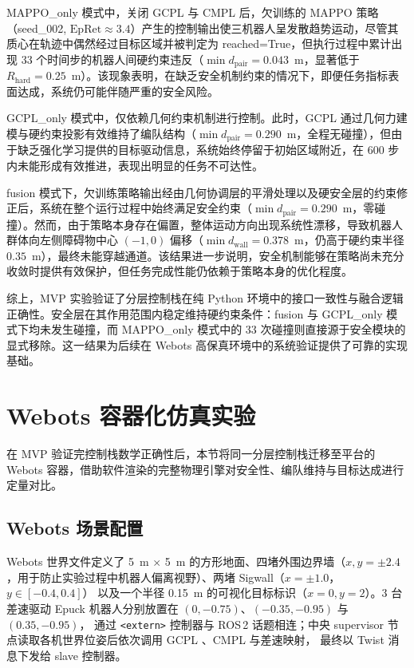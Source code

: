 MAPPO\_only 模式中，关闭 GCPL 与 CMPL 后，欠训练的 MAPPO 策略（seed\_002, $\mathrm{EpRet}\approx 3.4$）产生的控制输出使三机器人呈发散趋势运动，尽管其质心在轨迹中偶然经过目标区域并被判定为 reached=True，但执行过程中累计出现 33 个时间步的机器人间硬约束违反（$\min d_\mathrm{pair}=0.043$~m，显著低于 $R_\mathrm{hard}=0.25$~m）。该现象表明，在缺乏安全机制约束的情况下，即便任务指标表面达成，系统仍可能伴随严重的安全风险。

GCPL\_only 模式中，仅依赖几何约束机制进行控制。此时，GCPL 通过几何力建模与硬约束投影有效维持了编队结构（$\min d_\mathrm{pair}=0.290$~m，全程无碰撞），但由于缺乏强化学习提供的目标驱动信息，系统始终停留于初始区域附近，在 600 步内未能形成有效推进，表现出明显的任务不可达性。

fusion 模式下，欠训练策略输出经由几何协调层的平滑处理以及硬安全层的约束修正后，系统在整个运行过程中始终满足安全约束（$\min d_\mathrm{pair}=0.290$~m，零碰撞）。然而，由于策略本身存在偏置，整体运动方向出现系统性漂移，导致机器人群体向左侧障碍物中心 $(-1,0)$ 偏移（$\min d_\mathrm{wall}=0.378$~m，仍高于硬约束半径 $0.35$~m），最终未能穿越通道。该结果进一步说明，安全机制能够在策略尚未充分收敛时提供有效保护，但任务完成性能仍依赖于策略本身的优化程度。

综上，MVP 实验验证了分层控制栈在纯 Python 环境中的接口一致性与融合逻辑正确性。安全层在其作用范围内稳定维持硬约束条件：fusion 与 GCPL\_only 模式下均未发生碰撞，而 MAPPO\_only 模式中的 33 次碰撞则直接源于安全模块的显式移除。这一结果为后续在 Webots 高保真环境中的系统验证提供了可靠的实现基础。

\section{Webots 容器化仿真实验}
\label{sec:chap5_webots_eval}

在 MVP 验证完控制栈数学正确性后，本节将同一分层控制栈迁移至平台的 Webots 容器，借助软件渲染的完整物理引擎对安全性、编队维持与目标达成进行定量对比。

\subsection{Webots 场景配置}
\label{sec:chap5_webots_scene}

Webots 世界文件定义了 5~m $\times$ 5~m 的方形地面、四堵外围边界墙（$x,y=\pm 2.4$，用于防止实验过程中机器人偏离视野）、两堵 Sigwall（$x=\pm 1.0$，$y\in[-0.4, 0.4]$）
以及一个半径 0.15~m 的可视化目标标识（$x=0, y=2$）。3 台差速驱动 E\-puck 机器人分别放置在 $(0,-0.75)$、$(-0.35,-0.95)$ 与 $(0.35,-0.95)$，
通过 \texttt{<extern>} 控制器与 ROS\,2  话题相连；中央 supervisor 节点读取各机世界位姿后依次调用 GCPL 、CMPL 与差速映射，
最终以 Twist 消息下发给 slave 控制器。

